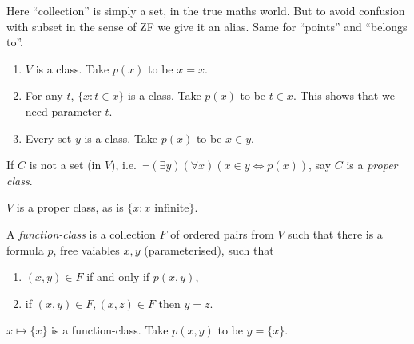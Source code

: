 \documentclass[a4paper]{article}
\begin{document}
Here ``collection'' is simply a set, in the true maths world. But to avoid confusion with subset in the sense of ZF we give it an alias. Same for ``points'' and ``belongs to''.

\begin{eg}\leavevmode
  \begin{enumerate}
  \item \(V\) is a class. Take \(p(x)\) to be \(x = x\).
  \item For any \(t\), \(\{x: t \in x\}\) is a class. Take \(p(x)\) to be \(t \in x\). This shows that we need parameter \(t\).
  \item Every set \(y\) is a class. Take \(p(x)\) to be \(x \in y\).
  \end{enumerate}
\end{eg}

\begin{definition}
  If \(C\) is not a set (in \(V\)), i.e.\ \(\neg (\exists y) (\forall x) (x \in y \iff p(x))\), say \(C\) is a \emph{proper class}.
\end{definition}

\begin{eg}
  \(V\) is a proper class, as is \(\{x: x \text{ infinite}\}\).
\end{eg}

\begin{definition}
  A \emph{function-class} is a collection \(F\) of ordered pairs from \(V\) such that there is a formula \(p\), free vaiables \(x, y\) (parameterised), such that
  \begin{enumerate}
  \item \((x, y) \in F\) if and only if \(p(x, y)\),
  \item if \((x, y) \in F, (x, z) \in F\) then \(y = z\).
  \end{enumerate}
\end{definition}

\begin{eg}
  \(x \mapsto \{x\}\) is a function-class. Take \(p(x, y)\) to be \(y = \{x\}\).
\end{eg}

\printindex
\end{document}

